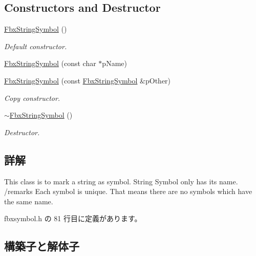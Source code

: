 \subsection*{Constructors and Destructor}
\begin{DoxyCompactItemize}
\item 
\hyperlink{class_fbx_string_symbol_a06af2f7b75ba61f8e3e97589d1cec76c}{Fbx\+String\+Symbol} ()
\begin{DoxyCompactList}\small\item\em Default constructor. \end{DoxyCompactList}\item 
\hyperlink{class_fbx_string_symbol_a245670546cbcfdf41514964b1a6bef90}{Fbx\+String\+Symbol} (const char $\ast$p\+Name)
\item 
\hyperlink{class_fbx_string_symbol_a586aec49bc085596bfa5b809a9948c3c}{Fbx\+String\+Symbol} (const \hyperlink{class_fbx_string_symbol}{Fbx\+String\+Symbol} \&p\+Other)
\begin{DoxyCompactList}\small\item\em Copy constructor. \end{DoxyCompactList}\item 
\hyperlink{class_fbx_string_symbol_a46f59347767596c5482dde0ecef7cdb1}{$\sim$\+Fbx\+String\+Symbol} ()
\begin{DoxyCompactList}\small\item\em Destructor. \end{DoxyCompactList}\end{DoxyCompactItemize}


\subsection{詳解}
This class is to mark a string as symbol. String Symbol only has its name. /remarks Each symbol is unique. That means there are no symbols which have the same name. 

 fbxsymbol.\+h の 81 行目に定義があります。



\subsection{構築子と解体子}
\mbox{\label{class_fbx_string_symbol_a06af2f7b75ba61f8e3e97589d1cec76c}} 
